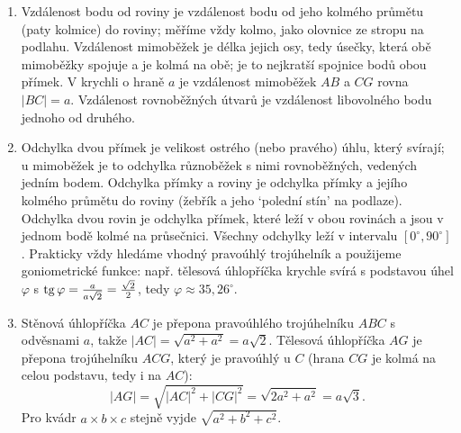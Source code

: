 \begin{enumerate}[label=\textbf{\arabic*.}, leftmargin=*, itemsep=0.8em]
  \item {}
  Vzdálenost bodu od roviny je vzdálenost bodu od jeho kolmého průmětu (paty kolmice) do roviny; měříme vždy kolmo, jako olovnice ze stropu na podlahu. Vzdálenost mimoběžek je délka jejich osy, tedy úsečky, která obě mimoběžky spojuje a je kolmá na obě; je to nejkratší spojnice bodů obou přímek. V krychli o hraně $a$ je vzdálenost mimoběžek $AB$ a $CG$ rovna $|BC| = a$. Vzdálenost rovnoběžných útvarů je vzdálenost libovolného bodu jednoho od druhého. 

  \item {}
  Odchylka dvou přímek je velikost ostrého (nebo pravého) úhlu, který svírají; u mimoběžek je to odchylka různoběžek s nimi rovnoběžných, vedených jedním bodem. Odchylka přímky a roviny je odchylka přímky a jejího kolmého průmětu do roviny (žebřík a jeho `polední stín' na podlaze). Odchylka dvou rovin je odchylka přímek, které leží v obou rovinách a jsou v jednom bodě kolmé na průsečnici. Všechny odchylky leží v intervalu $[0^\circ, 90^\circ]$. Prakticky vždy hledáme vhodný pravoúhlý trojúhelník a použijeme goniometrické funkce: např. tělesová úhlopříčka krychle svírá s podstavou úhel $\varphi$ s $\operatorname{tg}\varphi = \frac{a}{a\sqrt{2}} = \frac{\sqrt{2}}{2}$, tedy $\varphi\approx 35{,}26^\circ$.

  \item {}
  Stěnová úhlopříčka $AC$ je přepona pravoúhlého trojúhelníku $ABC$ s odvěsnami $a$, takže $|AC| = \sqrt{a^2 + a^2} = a\sqrt{2}$. Tělesová úhlopříčka $AG$ je přepona trojúhelníku $ACG$, který je pravoúhlý u $C$ (hrana $CG$ je kolmá na celou podstavu, tedy i na $AC$):
  \begin{equation*}
    |AG| = \sqrt{|AC|^2 + |CG|^2} = \sqrt{2a^2 + a^2} = a\sqrt{3}.
  \end{equation*}
  Pro kvádr $a\times b\times c$ stejně vyjde $\sqrt{a^2 + b^2 + c^2}$. 


\end{enumerate}
